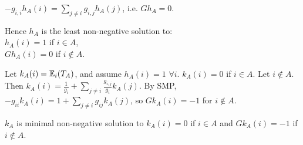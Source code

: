 \documentclass[a4paper]{article}
\begin{document}
$-g_{i,i}h_A(i) = \sum_{j \neq i} g_{i,j} h_A(j)$, i.e. $Gh_A = 0$.

Hence $h_A$ is the least non-negative solution to:\\
$h_A(i) = 1$ if $i \in A$,\\
$Gh_A(i) = 0$ if $i \not\in A$.

Let $k_A(i) = \mathbb{E}_i(T_A)$, and assume $h_A(i) = 1$ $\forall i$. $k_A(i) = 0$ if $i \in A$. Let $i \not\in A$. Then $k_A(i) = \frac{1}{g_i} + \sum_{j \neq i} \frac{g_{i,j}}{g_i} k_A(j)$. By SMP, $-g_{ii}k_A(i) = 1+\sum_{j \neq i} g_{ij} k_A(j)$, so $Gk_A(i) = -1$ for $i \not\in A$.

\begin{thm}
$k_A$ is minimal non-negative solution to $k_A(i) = 0$ if $i\in A$ and $Gk_A(i) = -1$ if $i \not\in A$.
\end{thm}

\end{document}
